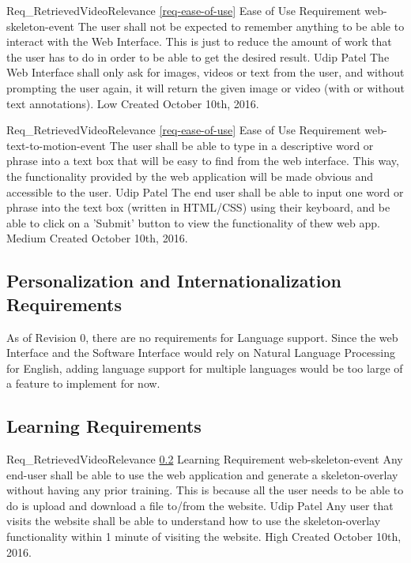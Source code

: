 \documentclass{scrreprt}
\begin{document}
\requirement
{Req_RetrievedVideoRelevance}
{\ref{req-ease-of-use} Ease of Use Requirement}
{web-skeleton-event}
{The user shall not be expected to remember anything to be able to interact with the Web Interface.}
{This is just to reduce the amount of work that the user has to do in order to be able to get the desired result.}
{Udip Patel}
{The Web Interface shall only ask for images, videos or text from the user, and without prompting the user again, it will return the given image or video (with or without text annotations).}
{Low}
{Created October 10th, 2016.}

\requirement
{Req_RetrievedVideoRelevance}
{\ref{req-ease-of-use} Ease of Use Requirement}
{web-text-to-motion-event}
{The user shall be able to type in a descriptive word or phrase into a text box that will be easy to find from the web interface.}
{This way, the functionality provided by the web application will be made obvious and accessible to the user.}
{Udip Patel}
{The end user shall be able to input one word or phrase into the text box (written in HTML/CSS) using their keyboard, and be able to click on a 'Submit' button to view the functionality of thew web app.}
{Medium}
{Created October 10th, 2016.}

\subsection{Personalization and Internationalization Requirements}

As of Revision 0, there are no requirements for Language support. Since the web Interface and the Software Interface would rely on Natural Language Processing for English, adding language support for multiple languages would be too large of a feature to implement for now.

\subsection{Learning Requirements}
\label{req-learning}

\requirement
{Req_RetrievedVideoRelevance}
{\ref{req-learning} Learning Requirement}
{web-skeleton-event}
{Any end-user shall be able to use the web application and generate a skeleton-overlay without having any prior training.}
{This is because all the user needs to be able to do is upload and download a file to/from the website.}
{Udip Patel}
{Any user that visits the website shall be able to understand how to use the skeleton-overlay functionality within 1 minute of visiting the website.}
{High}
{Created October 10th, 2016.}
\end{document}
